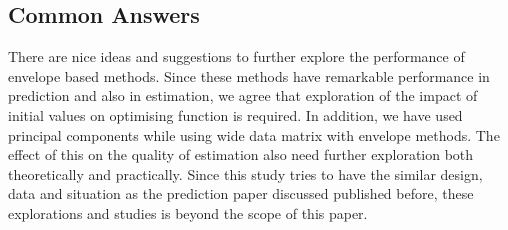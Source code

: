 \documentclass[11pt, a4paper]{article}
\begin{document}
\subsection{Common Answers}
\label{sec:common}

\textcolor{mycolor1}{There are nice ideas and suggestions to further explore the performance of envelope based methods. Since these methods have remarkable performance in prediction and also in estimation, we agree that exploration of the impact of initial values on optimising function is required. In addition, we have used principal components while using wide data matrix with envelope methods. The effect of this on the quality of estimation also need further exploration both theoretically and practically. Since this study tries to have the similar design, data and situation as the prediction paper discussed published before, these explorations and studies is beyond the scope of this paper.}
\end{document}

